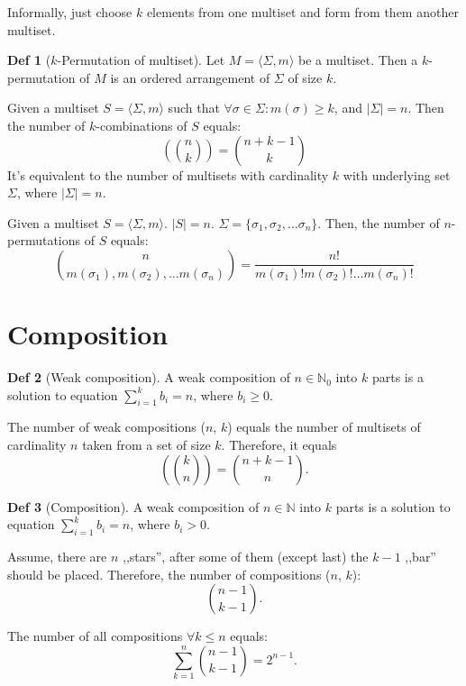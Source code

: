 \documentclass[a4paper]{article}
\theoremstyle{definition}
\newtheorem{definition}{Def}
\begin{document}
Informally, just choose \(k\) elements from one multiset
and form from them another multiset.

\begin{definition}[\(k\)-Permutation of multiset]
  Let \(M = \langle \Sigma, m \rangle\) be a multiset.
  Then a \(k\)-permutation of \(M\)
  is an ordered arrangement of \(\Sigma\) of size \(k\).
\end{definition}

Given a multiset \(S = \langle \Sigma, m \rangle\) such that
\(\forall \sigma \in \Sigma : m(\sigma) \ge k\),
and \(|\Sigma| = n\).
Then the number of \(k\)-combinations of \(S\) equals:
\[\left(\binom{n}{k}\right) = \binom{n + k - 1}{k}\]
It's equivalent to the number of multisets with cardinality \(k\)
with underlying set \(\Sigma\), where \(|\Sigma| = n\).

Given a multiset \(S = \langle \Sigma, m \rangle\).
\(|S| = n\).
\(\Sigma = \{\sigma_1, \sigma_2, \ldots \sigma_n\}\).
Then, the number of \(n\)-permutations of \(S\) equals:
\[ \binom{n}{m(\sigma_1), m(\sigma_2), \ldots m(\sigma_n)}
  = \frac{n!}{m(\sigma_1)! m(\sigma_2)! \ldots m(\sigma_n)!} \]

\section{Composition}

\begin{definition}[Weak composition]
  A weak composition of \(n \in \mathbb{N}_0\) into \(k\) parts
  is a solution to equation \(\sum_{i = 1}^{k} b_i = n\), where
  \(b_i \ge 0\).
\end{definition}

The number of weak compositions (\(n\), \(k\))
equals the number of multisets of cardinality \(n\) taken
from a set of size \(k\).
Therefore, it equals
\[
  \left( \binom{k}{n} \right)
  = \binom{n + k - 1}{n}
.\]

\begin{definition}[Composition]
  A weak composition of \(n \in \mathbb{N}\) into \(k\) parts
  is a solution to equation \(\sum_{i = 1}^{k} b_i = n\), where
  \(b_i > 0\).
\end{definition}

Assume, there are \(n\) ,,stars'', after some of them (except last)
the \(k - 1\) ,,bar'' should be placed.
Therefore, the number of compositions (\(n\), \(k\)):
\[
  \binom{n - 1}{k - 1}
.\]

The number of all compositions \(\forall k \le n\) equals:
\[
  \sum_{k = 1}^{n} \binom{n - 1}{k - 1} = 2^{n - 1}
.\]
\end{document}
